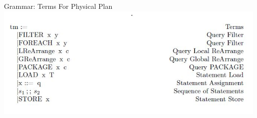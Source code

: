 \begin{frame}{Grammar: Terms For Physical Plan}
\centering
\includegraphics[scale=0.6]{Images/Grammar/Terms_Physical.JPG} 
\end{frame}


